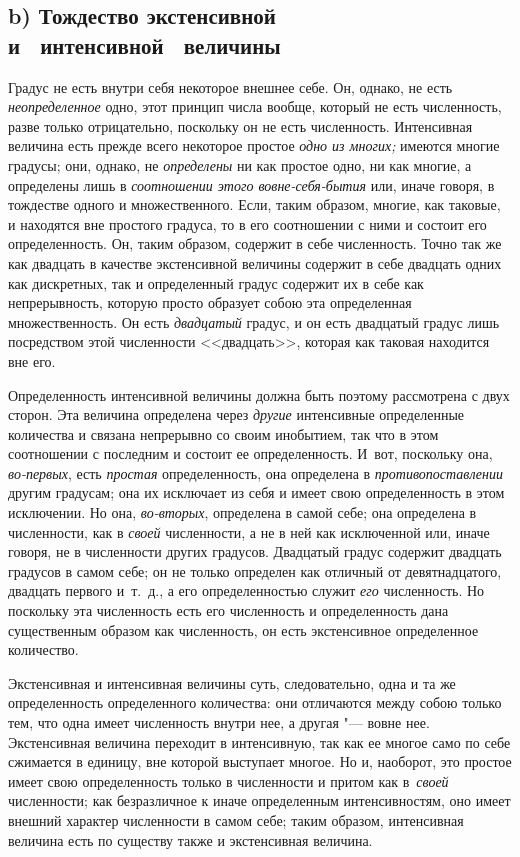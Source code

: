 \subsection[b) Тождество экстенсивной и интенсивной величины]%
{b) Тождество экстенсивной\nopagebreak\\и~ интенсивной~ величины}

Градус не есть внутри себя некоторое внешнее себе. Он, однако, не есть
{\em неопределенное} одно, этот принцип числа вообще, который не есть
численность, разве только отрицательно, поскольку он не есть численность.
Интенсивная величина есть прежде всего некоторое простое {\em одно из многих;}
имеются многие градусы; они, однако, не {\em определены} ни как простое одно,
ни как многие, а определены лишь в {\em соотношении этого вовне-себя-бытия} или,
иначе говоря, в тождестве одного и множественного. Если, таким образом, многие,
как таковые, и находятся вне простого градуса, то в его соотношении с ними и
состоит его определенность. Он, таким образом, содержит в себе численность.
Точно так же как двадцать в качестве экстенсивной величины содержит в себе
двадцать одних как дискретных, так и определенный градус содержит их в себе как
непрерывность, которую просто образует собою эта определенная множественность.
Он есть {\em двадцатый} градус, и он есть двадцатый градус лишь посредством
этой численности <<двадцать>>, которая как таковая находится вне его.

Определенность интенсивной величины должна быть поэтому рассмотрена с двух
сторон. Эта величина определена через {\em другие} интенсивные определенные
количества и связана непрерывно со своим инобытием, так что в этом соотношении
с последним и состоит ее определенность. И~вот, поскольку она, {\em во-первых},
есть {\em простая} определенность, она определена в {\em противопоставлении}
другим градусам; она их исключает из себя и имеет свою определенность в этом
исключении. Но она, {\em во-вторых}, определена в самой себе; она определена в
численности, как в {\em своей} численности, а не в ней как исключенной или,
иначе говоря, не в численности других градусов. Двадцатый градус содержит
двадцать градусов в самом себе; он не только определен как отличный от
девятнадцатого, двадцать первого и~т.~д., а его определенностью служит
{\em его} численность. Но поскольку эта численность есть его численность
и определенность дана существенным образом как численность, он есть
экстенсивное определенное количество.

Экстенсивная и интенсивная величины суть, следовательно, одна и та же
определенность определенного количества: они отличаются между собою только тем,
что одна имеет численность внутри нее, а другая "--- вовне нее.
Экстенсивная величина переходит в интенсивную, так как ее многое само по себе
сжимается в единицу, вне которой выступает многое. Но и, наоборот, это простое
имеет свою определенность только в численности и притом как в~{\em своей}
численности; как безразличное к иначе определенным интенсивностям, оно имеет
внешний характер численности в самом себе; таким образом, интенсивная величина
есть по существу также и экстенсивная величина.

